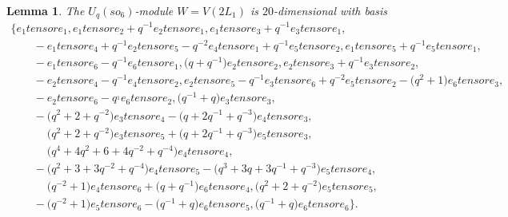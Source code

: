 \documentclass[10pt,a4paper]{amsart}
\numberwithin{equation}{section}
\newtheorem{Lemma}[Theorem]{Lemma}
\theoremstyle{definition}
\def\mathcal#1{#1}
\def\mathfrak#1{#1}
\def\otimes{ tensor }
\begin{document}
\begin{Lemma}\label{lemma--Wis20dimensional} The $\mathcal{U}_q(\mathfrak{so}_6)$-module $W=V(2L_1)$ is $20$-dimensional with basis
\begin{gather}
 \{ e_1 \otimes e_1, e_1 \otimes e_2 + q^{-1}e_2 \otimes e_1, e_1\otimes e_3 + q^{-1}e_3 \otimes e_1,\nonumber \\
 \qquad-e_1 \otimes e_4 +q^{-1}e_2 \otimes e_5 - q^{-2}e_4 \otimes e_1+q^{-1}e_5 \otimes e_2, e_1\otimes e_5 +q^{-1}e_5 \otimes e_1, \nonumber\\
 \qquad- e_1 \otimes e_6-q^{-1}e_6 \otimes e_1, \bigl(q+q^{-1}\bigr)e_2 \otimes e_2,e_2 \otimes e_3 + q^{-1} e_3 \otimes e_2, \nonumber\\
 \qquad-e_2 \otimes e_4 -q^{-1}e_4 \otimes e_2, e_2 \otimes e_5 - q^{-1}e_3 \otimes e_6+q^{-2}e_5 \otimes e_2 -\bigl(q^2+1\bigr)e_6 \otimes e_3,\nonumber\\
 \qquad-e_2 \otimes e_6 -q^{_1}e_6\otimes e_2,\bigl(q^{-1}+q\bigr)e_3 \otimes e_3, \nonumber\\
 \qquad-\bigl(q^2 +2 +q^{-2}\bigr)e_3 \otimes e_4 - \bigl(q+2q^{-1}+q^{-3}\bigr)e_4 \otimes e_3, \nonumber\\
 \qquad\phantom{-}{}\bigl(q^2 + 2+q^{-2}\bigr)e_3 \otimes e_5 + \bigl(q+2q^{-1}+q^{-3}\bigr)e_5 \otimes e_3, \nonumber \\
 \qquad\phantom{-}{}
 \bigl(q^4 + 4q^2 + 6 + 4q^{-2} + q^{-4}\bigr)e_4 \otimes e_4,\nonumber \\
 \qquad-\bigl(q^2+3+3q^{-2}+q^{-4}\bigr)e_4 \otimes e_5 - \bigl(q^3 +3q+3q^{-1}+q^{-3}\bigr)e_5 \otimes e_4, \nonumber \\
 \qquad\phantom{-}{}\bigl(q^{-2}+1\bigr)e_4 \otimes e_6 +\bigl(q+q^{-1}\bigr)e_6 \otimes e_4,\bigl(q^2+2+q^{-2}\bigr)e_5 \otimes e_5,\nonumber \\
 \qquad-\bigl(q^{-2}+1\bigr)e_5 \otimes e_6 - \bigl(q^{-1}+q\bigr)e_6 \otimes e_5, \bigl(q^{-1}+q\bigr)e_6 \otimes e_6\}. \label{Wbasis}
\end{gather}
\end{Lemma}
\end{document}
